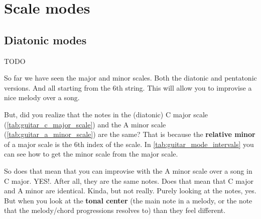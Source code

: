 \section{Scale modes}

\subsection{Diatonic modes}

TODO

\iffalse
So far we have seen the major and minor scales. Both the diatonic and pentatonic versions. And all starting from the 6th string. This will allow you to improvise a nice melody over a song.

But, did you realize that the notes in the (diatonic) C major scale (\autoref{tab:guitar_c_major_scale}) and the A minor scale (\autoref{tab:guitar_a_minor_scale}) are the same? That is because the \textbf{relative minor} of a major scale is the 6th index of the scale. In \autoref{tab:guitar_mode_intervals} you can see how to get the minor scale from the major scale.

So does that mean that you can improvise with the A minor scale over a song in C major. YES!. After all, they are the same notes. Does that mean that C major and A minor are identical. Kinda, but not really. Purely looking at the notes, yes. But when you look at the \textbf{tonal center} (the main note in a melody, or the note that the melody/chord progressions resolves to) than they feel different.

